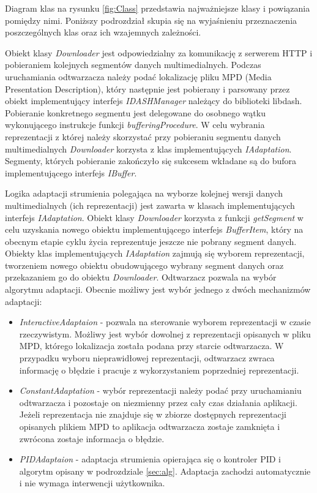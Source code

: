 Diagram klas na rysunku \ref{fig:Class} przedstawia najważniejsze klasy i powiązania pomiędzy nimi. Poniższy podrozdział skupia się na wyjaśnieniu przeznaczenia poszczególnych klas oraz ich wzajemnych zależności.

Obiekt klasy \textit{Downloader} jest odpowiedzialny za komunikację z serwerem HTTP i pobieraniem kolejnych segmentów danych multimedialnych. Podczas uruchamiania odtwarzacza należy podać lokalizację pliku MPD (Media Presentation Description), który następnie jest pobierany i parsowany przez obiekt implementujący interfejs \textit{IDASHManager} należący do biblioteki libdash. Pobieranie konkretnego segmentu jest delegowane do osobnego wątku wykonującego instrukcje funkcji \textit{bufferingProcedure}. W celu wybrania reprezentacji z której należy skorzystać przy pobieraniu segmentu danych multimedialnych \textit{Downloader} korzysta z klas implementujących \textit{IAdaptation}. Segmenty, których pobieranie zakończyło się sukcesem wkładane są do bufora implementującego interfejs \textit{IBuffer}. 

Logika adaptacji strumienia polegająca na wyborze kolejnej wersji danych multimedialnych (ich reprezentacji) jest zawarta w klasach implementujących interfejs \textit{IAdaptation}. Obiekt klasy \textit{Downloader} korzysta z funkcji \textit{getSegment} w celu uzyskania nowego obiektu implementującego interfejs \textit{BufferItem}, który na obecnym etapie cyklu życia reprezentuje jeszcze nie pobrany segment danych. Obiekty klas implementujących \textit{IAdaptation} zajmują się wyborem reprezentacji, tworzeniem nowego obiektu obudowującego wybrany segment danych oraz przekazaniem go do obiektu \textit{Downloader}. Odtwarzacz pozwala na wybór algorytmu adaptacji. Obecnie możliwy jest wybór jednego z dwóch mechanizmów adaptacji:
\begin{itemize}
\item \textit{InteractiveAdaptaion} - pozwala na sterowanie wyborem reprezentacji w czasie rzeczywistym. Możliwy jest wybór dowolnej z reprezentacji opisanych w pliku MPD, którego lokalizacja została podana przy starcie odtwarzacza. W przypadku wyboru nieprawidłowej reprezentacji, odtwarzacz zwraca informację o błędzie i pracuje z wykorzystaniem poprzedniej reprezentacji.
\item \textit{ConstantAdaptation} - wybór reprezentacji należy podać przy uruchamianiu odtwarzacza i pozostaje on niezmienny przez cały czas działania aplikacji. Jeżeli reprezentacja nie znajduje się w zbiorze dostępnych reprezentacji opisanych plikiem MPD to aplikacja odtwarzacza zostaje zamknięta i zwrócona zostaje informacja o błędzie.
\item \textit{PIDAdaptaion} - adaptacja strumienia opierająca się o kontroler PID i algorytm opisany w podrozdziale \ref{sec:alg}. Adaptacja zachodzi automatycznie i nie wymaga interwencji użytkownika.
\end{itemize}

